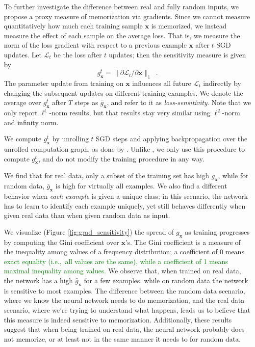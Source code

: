 \documentclass{article}
\newcommand{\af}[1]{\textcolor{green}{#1}}
\newcommand{\af}[1]{\textcolor{black}{#1}}
\begin{document}
To further investigate the difference between real and fully random inputs, we propose a proxy measure of memorization via gradients. Since we cannot measure quantitatively how much each training sample $\mathbf{x}$ is memorized, we instead measure the effect of each sample on the average loss. 
That is, we measure the norm of the loss gradient with respect to a previous example $\mathbf{x}$ after $t$ SGD updates. 
Let $\mathcal{L}_t$ be the loss after $t$ updates; then the sensitivity measure is given by
$$g^t_\mathbf{x}=\|\partial \mathcal{L}_t/\partial \mathbf{x}\|_1 \enspace.$$
The parameter update from training on $\mathbf{x}$ influences all future $\mathcal{L}_t$ indirectly by changing the subsequent updates on different training examples.
We denote the average over $g^t_\mathbf{x}$ after $T$ steps as $\bar{g}_\mathbf{x}$, and refer to it as \emph{loss-sensitivity}. Note that we only report $\ell^1$-norm results, but that results stay very similar using  $\ell^2$-norm and infinity norm. 

We compute $g^t_\mathbf{x}$ by unrolling $t$ SGD steps and applying backpropagation over the unrolled computation graph, as done by \citet{maclaurin2015gradient}.
Unlike \citet{maclaurin2015gradient}, we only use this procedure to compute $g^t_\mathbf{x}$, and do not modify the training procedure in any way.

We find that for real data, only a subset of the training set has high $\bar{g}_\mathbf{x}$, while for random data, $\bar{g}_\mathbf{x}$ is high for virtually all examples. We also find a different behavior when \textit{each example} is given a unique class; in this scenario, the network has to learn to identify each example uniquely,
yet still behaves differently when given real data than when given random data as input.

We visualize  (Figure \ref{fig:grad_sensitivity}) the spread of $\bar{g}_\mathbf{x}$ as training progresses by computing the Gini coefficient over $\mathbf{x}$'s. The Gini coefficient \citep{gini} is a measure of the inequality among values of a frequency distribution; a coefficient of 0 means \af{exact equality (i.e.,~all values are the same), while a coefficient of 1 means maximal inequality among values.}
We observe that, when trained on real data, the network has a high $\bar{g}_\mathbf{x}$ for a few examples, while on random data the network is sensitive to most examples. The difference between the random data scenario, where we know the neural network needs to do memorization, and the real data scenario, where we're trying to understand what happens, leads us to believe that this measure is indeed sensitive to memorization. Additionally, these results suggest that when being trained on real data, the neural network probably does not memorize, or at least not in the same manner it needs to for random data.
\end{document}
